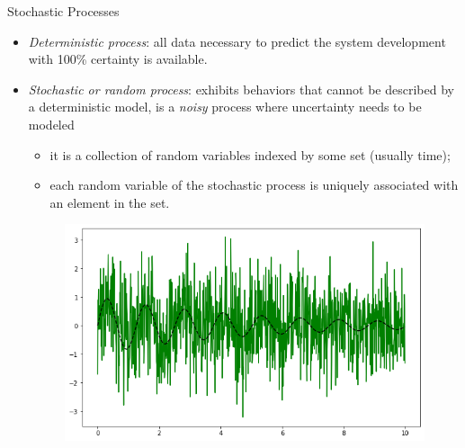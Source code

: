 \documentclass{beamer}
\begin{document}
%

\begin{frame}{Stochastic Processes}
\begin{itemize}
\item \emph{Deterministic process}: all data necessary to predict the system development with 100\% certainty is available.
\item \emph{Stochastic or random process}: exhibits behaviors that cannot be described by a deterministic model, is a \emph{noisy} process where uncertainty needs to be modeled
   \begin{itemize}
    \item it is a collection of random variables indexed by some set (usually time);
    \item each random variable of the stochastic process is uniquely associated with an element in the set. 
    \end{itemize}
\begin{figure}[h]
    \begin{center}
    \includegraphics[width=0.5\linewidth]{stochastic_process}
    \end{center}
\end{figure}        
\end{itemize}
\end{frame}
\end{document}
